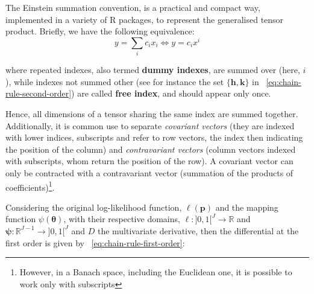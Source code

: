 \documentclass[long, final]{jobim}
\newcommand \RR {\mathbb{R}}
\begin{document}
\begin{definition}
\end{definition}

\begin{definition}
\label{def:einstein-summation}
    The Einstein summation convention, is a practical and compact way, implemented in a variety of R packages, to represent the generalised tensor product. Briefly, we have the following equivalence:
\begin{equation*}
    y = \sum_{i} c_i x_i \Longleftrightarrow y = c_i x^i
\end{equation*}

where repeated indexes, also termed \textbf{dummy indexes}, are summed over (here, $i$), while indexes not summed other (see for instance the set $\{\boldsymbol{h}, \boldsymbol{k}\}$ in \equationname~\ref{eq:chain-rule-second-order}) are called \textbf{free index}, and should appear only once. 

Hence, all dimensions of a tensor sharing the same index are summed together. Additionally, it is common use to separate \textit{covariant vectors} (they are indexed with lower indices, subscripts and refer to row vectors, the index then indicating the position of the column) and \textit{contravariant vectors} (column vectors indexed with subscripts, whom return the position of the row).  A covariant vector can only be contracted with a contravariant vector (summation of the products of coefficients)\footnote{However, in a Banach space, including the  Euclidean one,  it is possible to work only with subscripts}. 
\end{definition}

Considering the original log-likelihood function, $\ell(\boldsymbol{p})$ and the mapping function $\psi(\boldsymbol{\theta})$, with their respective domains, $\ell: ]0, 1[^J \to \RR$ and $\boldsymbol{\psi}:\RR^{J-1} \to ]0, 1[^J$ and $D$ the multivariate derivative, then the differential at the first order is given by \equationname~\ref{eq:chain-rule-first-order}:
\end{document}
